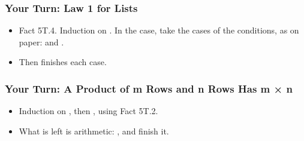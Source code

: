 \documentclass{ltx-talk}
\begin{document}
\begin{frame*}
  \frametitle{Your Turn: Law 1 for Lists}
  \begin{itemize}
    \item {} Fact 5T.4. Induction on . In the 
      case, take the cases of the conditions, as on paper:  and .
    \item Then  finishes each case.
  \end{itemize}
\end{frame*}

\begin{frame*}
  \frametitle{Your Turn: A Product of m Rows and n Rows Has m × n}
  \begin{itemize}
    \item {} Induction on , then , using Fact 5T.2.
    \item What is left is arithmetic: ,
       and  finish it.
  \end{itemize}
\end{frame*}
\end{document}
